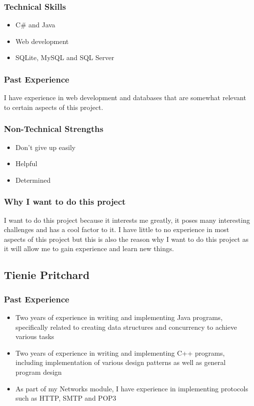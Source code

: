 \subsubsection{Technical Skills} 
	\begin{itemize}
		\item C\# and Java
		\item Web development
		\item SQLite, MySQL and SQL Server
	\end{itemize}
\subsubsection{Past Experience}
I have experience in web development and databases that are somewhat relevant to certain aspects of this project.
\subsubsection{Non-Technical Strengths}
	\begin{itemize}
		\item Don't give up easily
		\item Helpful
		\item Determined
	\end{itemize}
\subsubsection{Why I want to do this project} 
I want to do this project because it interests me greatly, it poses many interesting challenges and has a cool factor to it. I have little to no experience in most aspects of this project but this is also the reason why I want to do this project as it will allow me to gain experience and learn new things. 
 

\pagebreak
\subsection{Tienie Pritchard}

\subsubsection{Past Experience} 
\begin{itemize}
	\item{Two years of experience in writing and implementing Java programs, specifically related to creating data structures and concurrency to achieve various tasks}
	\item{Two years of experience in writing and implementing C++ programs, including implementation of various design patterns as well as general program design}
	\item{As part of my Networks module, I have experience in implementing protocols such as HTTP, SMTP and POP3}
\end{itemize}
